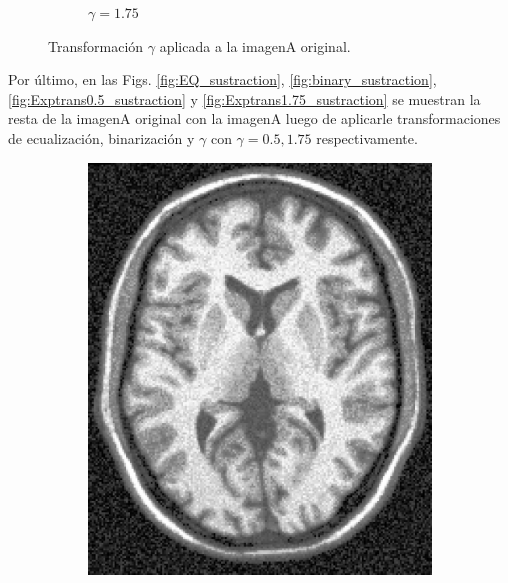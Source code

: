 \documentclass[letterpaper,12pt]{article}
\theoremstyle{plain}
\begin{document}
\begin{figure}[h]
\begin{subfigure}[h]{0.32\linewidth}
            \caption{$\gamma = 1.75$} 
         \end{subfigure}
    \caption{Transformación $\gamma$ aplicada a la imagenA original.}
    \label{fig:Exptrans}
\end{figure}

Por último, en las Figs. \ref{fig:EQ_sustraction}, \ref{fig:binary_sustraction}, \ref{fig:Exptrans0.5_sustraction} y \ref{fig:Exptrans1.75_sustraction} se muestran la resta de la imagenA original con la imagenA luego de aplicarle transformaciones de ecualización, binarización y $\gamma$ con $\gamma = 0.5,1.75$ respectivamente.

\begin{figure}[h]
    \centering
        \begin{subfigure}[h]{0.24\linewidth}
            \centering
            \includegraphics[width=\textwidth]{Figuras/ImageA_EQ}
        \end{subfigure}
        \begin{subfigure}[h]{0.24\linewidth}
            \centering

\end{subfigure}
\end{figure}
\end{document}
